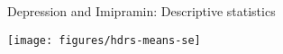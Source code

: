 \documentclass{beamer}
\newcommand{\vect}[1]{\mathbf{#1}}
\newcommand{\mat}[1]{\mathbf{#1}}
\newcommand{\gmat}[1]{\boldsymbol{#1}}
\begin{document}
%   
% 
 
\begin{frame}{Depression and Imipramin: Descriptive statistics}
  {\citep{ReisbyGram77}}
\begin{center}
\texttt{[image: figures/hdrs-means-se]}
\end{center}
\end{frame}
\end{document}
